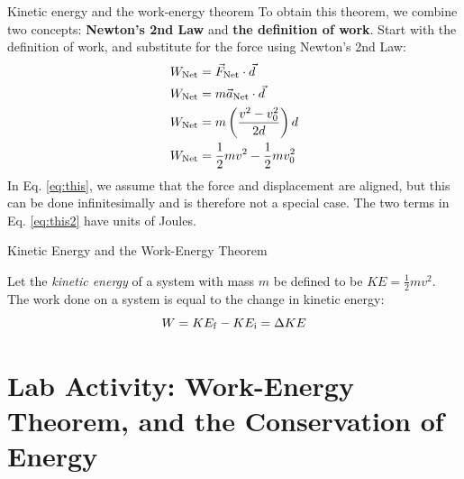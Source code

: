 \documentclass{beamer}
\begin{document}
\begin{frame}{Kinetic energy and the work-energy theorem}
To obtain this theorem, we combine two concepts: \alert{\textbf{Newton's 2nd Law}} and \alert{\textbf{the definition of work}}.  Start with the definition of work, and substitute for the force using Newton's 2nd Law:
\begin{align}
W_{\rm Net} &= \vec{F}_{\rm Net} \cdot \vec{d} \\
W_{\rm Net} &= m\vec{a}_{\rm Net} \cdot \vec{d} \\
W_{\rm Net} &= m\left(\frac{v^2-v_{\rm 0}^2}{2d}\right) d \label{eq:this} \\
W_{\rm Net} &= \frac{1}{2}mv^2 - \frac{1}{2}mv_{\rm 0}^2 \label{eq:this2}
\end{align}
In Eq. \ref{eq:this}, we assume that the force and displacement are aligned, but this can be done infinitesimally and is therefore not a special case. The two terms in Eq. \ref{eq:this2} have units of Joules.
\end{frame}

\begin{frame}{Kinetic Energy and the Work-Energy Theorem}
\begin{tcolorbox}[colback=white,colframe=red!40!blue,title=The Work-Energy Theorem]
\small
\alert{
Let the \textit{kinetic energy} of a system with mass $m$ be defined to be $KE = \frac{1}{2}mv^2$.  The work done on a system is equal to the change in kinetic energy:
\begin{equation}
W = KE_{\rm f} - KE_{\rm i} = \Delta KE
\end{equation}
}
\end{tcolorbox}
\end{frame}

\section{Lab Activity: Work-Energy Theorem, and the Conservation of Energy}
\end{document}
